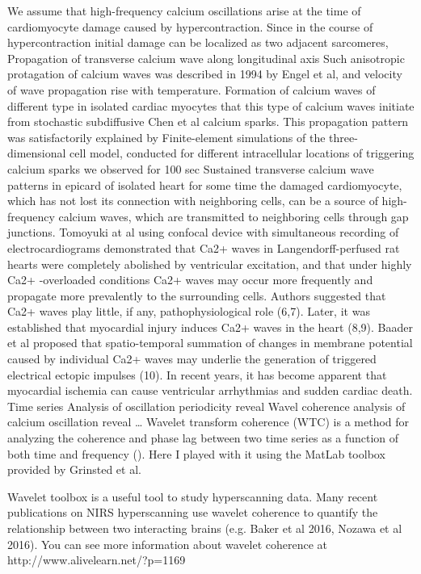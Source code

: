 \documentclass[a4paper,12pt]{article}
\begin{document}
We assume that high-frequency calcium oscillations arise at the time of cardiomyocyte damage caused by hypercontraction.
Since in the course of hypercontraction initial damage can be localized as two adjacent sarcomeres,
Propagation of transverse calcium wave along longitudinal axis
Such anisotropic protagation of calcium waves was described in 1994 by Engel et al, and velocity of wave propagation rise with temperature.
Formation of calcium waves of different type in isolated cardiac myocytes \cite{ishida1999formation}
that this type of calcium waves initiate from stochastic \cite{izu2001evolution} subdiffusive  \cite{chen2014ryanodine} Chen et al  calcium sparks.
This propagation pattern was satisfactorily explained by Finite-element simulations of the three-dimensional cell model, conducted for different intracellular locations of triggering calcium sparks \cite{tracqui2009integrated}
we observed for 100 sec Sustained transverse calcium wave patterns in epicard of isolated heart
for some time the damaged cardiomyocyte, which has not lost its connection with neighboring cells, can be a source of high-frequency calcium waves, which are transmitted to neighboring cells through gap junctions.
Tomoyuki at al using confocal device with simultaneous recording of electrocardiograms demonstrated that Ca2+ waves in Langendorff-perfused rat hearts were completely abolished by ventricular excitation, and that under highly Ca2+ -overloaded conditions Ca2+ waves may occur more frequently and propagate more prevalently to the surrounding cells. Authors suggested that Ca2+ waves play little, if any, pathophysiological role (6,7). Later, it was established that myocardial injury induces Ca2+ waves in the heart (8,9). Baader et al proposed that spatio-temporal summation of changes in membrane potential caused by individual Ca2+ waves may underlie the generation of triggered electrical ectopic impulses (10).
In recent years, it has become apparent that myocardial ischemia can cause ventricular arrhythmias and sudden cardiac death.
Time series
Analysis of oscillation periodicity reveal
Wavel coherence analysis of calcium oscillation reveal …
Wavelet transform coherence (WTC) is a method for analyzing the coherence and phase lag between two time series as a function of both time and frequency (\cite{chang2010time}).
Here I played with it using the MatLab toolbox provided by Grinsted et al.


Wavelet toolbox is a useful tool to study hyperscanning data. Many recent publications on NIRS hyperscanning use wavelet coherence to quantify the relationship between two interacting brains (e.g. Baker et al 2016, Nozawa et al 2016). You can see more information about wavelet coherence at http://www.alivelearn.net/?p=1169
\end{document}
